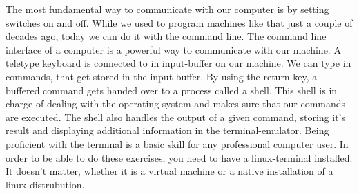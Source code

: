 \documentclass{dcbl/challenge}
\begin{document}
The most fundamental way to communicate with our computer is by setting switches on and off. 
While we used to program machines like that just a couple of decades ago, today we can do it with the command line.
The command line interface of a computer is a powerful way to communicate with our machine. 
A teletype keyboard is connected to in input-buffer on our machine. 
We can type in commands, that get stored in the input-buffer. 
By using the return key, a buffered command gets handed over to a process called a shell.
This shell is in charge of dealing with the operating system and makes sure that our commands are executed. 
The shell also handles the output of a given command, storing it's result and displaying additional information in the terminal-emulator.
Being proficient with the terminal is a basic skill for any professional computer user.
In order to be able to do these exercises, you need to have a linux-terminal installed. 
It doesn't matter, whether it is a virtual machine or a native installation of a linux distrubution.
\end{document}
